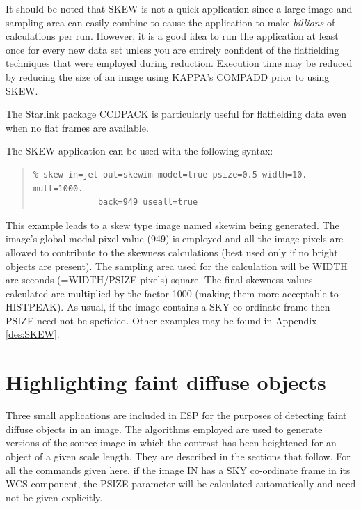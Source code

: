 \documentclass[twoside,11pt]{article}
\newcommand{\xref}[3]{#1}
\newenvironment{myquote}{\begin{quote}\begin{small}}{\end{small}\end{quote}}
\begin{document}
It should be noted that SKEW is not a quick application since a large image and
sampling area can easily combine to cause the application to make {\em billions}
of calculations per run. However, it is a good idea to run the application at
least once for every new data set unless you are entirely confident of the
flatfielding techniques that were employed during reduction. Execution time
may be reduced by reducing the size of an image using \xref{KAPPA}{sun95}{}'s COMPADD prior
to using SKEW.

The Starlink package \xref{CCDPACK}{sun139}{} is particularly useful for flatfielding data
even when no flat frames are available.

The SKEW application can be used with the following syntax:

\begin{myquote}
\begin{verbatim}
% skew in=jet out=skewim modet=true psize=0.5 width=10. mult=1000.
             back=949 useall=true
\end{verbatim}
\end{myquote}

This example leads to a skew type image named skewim being generated.
The image's global modal pixel value (949) is employed and all the image
pixels are allowed to contribute to the skewness calculations (best used
only if no bright objects are present). The sampling area used for the
calculation will be WIDTH arc seconds (=WIDTH/PSIZE pixels) square.
The final skewness values calculated are multiplied by the factor
1000 (making them more acceptable to HISTPEAK).
As usual, if the image contains a SKY co-ordinate frame then PSIZE
need not be speficied.
Other examples may be
found in Appendix \ref{des:SKEW}.

\section{Highlighting faint diffuse objects}
\label{sec:highlighting}

Three small applications are included in ESP for the purposes of detecting faint
diffuse objects in an image. The algorithms employed are used to generate
versions of the source image in which the contrast has been heightened for
an object of a given scale length. They are described in the sections that
follow.
For all the commands given here, if the image IN has a SKY co-ordinate
frame in its WCS component, the PSIZE parameter will be calculated
automatically and need not be given explicitly.
\end{document}

